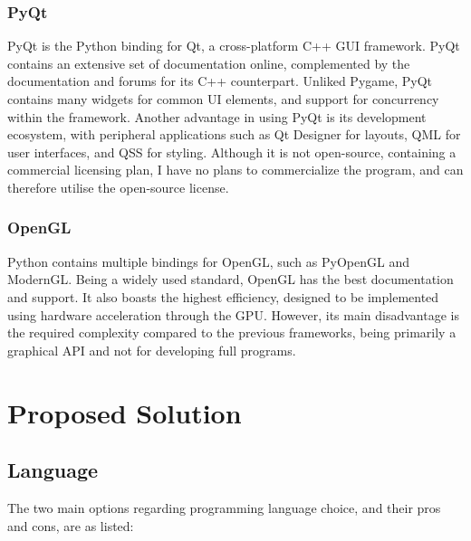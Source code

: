 \documentclass[../main/main.tex]{subfiles}
\begin{document}
\subsubsection*{PyQt}
PyQt is the Python binding for Qt, a cross-platform C++ GUI framework. PyQt contains an extensive set of documentation online, complemented by the documentation and forums for its C++ counterpart. Unliked Pygame, PyQt contains many widgets for common UI elements, and support for concurrency within the framework. Another advantage in using PyQt is its development ecosystem, with peripheral applications such as Qt Designer for layouts, QML for user interfaces, and QSS for styling. Although it is not open-source, containing a commercial licensing plan, I have no plans to commercialize the program, and can therefore utilise the open-source license. 

\subsubsection*{OpenGL}
Python contains multiple bindings for OpenGL, such as PyOpenGL and ModernGL. Being a widely used standard, OpenGL has the best documentation and support. It also boasts the highest efficiency, designed to be implemented using hardware acceleration through the GPU. However, its main disadvantage is the required complexity compared to the previous frameworks, being primarily a graphical API and not for developing full programs.

\section{Proposed Solution}
\subsection{Language}
The two main options regarding programming language choice, and their pros and cons, are as listed:
\end{document}
